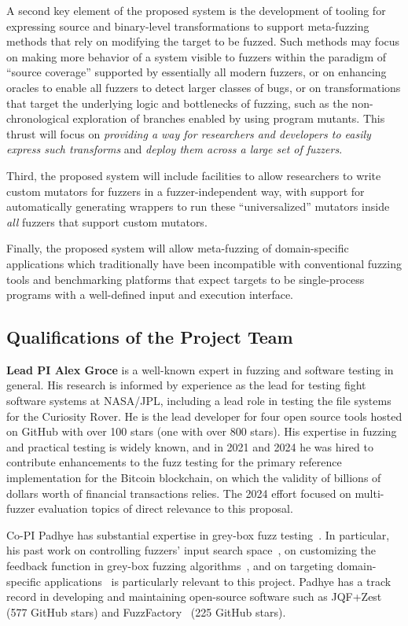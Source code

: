 A second key element of the proposed system is the development of tooling for 
expressing source and binary-level transformations to support meta-fuzzing 
methods that rely on modifying the target to be fuzzed.  Such methods may focus 
on making more behavior of a system visible to fuzzers within the paradigm of 
``source coverage'' supported by essentially all modern fuzzers, or 
on enhancing oracles to enable all fuzzers to detect larger classes of bugs, or 
on transformations that target the underlying logic and bottlenecks of fuzzing, 
such as the non-chronological exploration of branches enabled by using program 
mutants.  This thrust  will focus on \emph{providing a way for researchers and 
developers to easily express such transforms} and \emph{deploy them across a large set 
of fuzzers}.

Third, the proposed system will include facilities to allow researchers to 
write custom mutators for fuzzers in a fuzzer-independent way, with support for 
automatically generating wrappers to run these ``universalized'' mutators 
inside \emph{all} fuzzers that 
support custom mutators.

Finally, the proposed system will allow meta-fuzzing of domain-specific applications
which traditionally have been incompatible with conventional fuzzing tools and
benchmarking platforms that expect targets to be single-process programs with
a well-defined input and execution interface.

\subsection{Qualifications of the Project Team}

{\bf Lead PI Alex Groce} is a well-known expert in fuzzing and software testing
in general. His research is informed
by experience as the lead for testing fight software systems at NASA/JPL,
including a lead role in testing the file systems for the Curiosity
Rover. He is the lead developer for four open
source tools hosted on GitHub with over 100 stars (one with over 800
stars). His expertise in fuzzing and
practical testing is widely known, and in 2021 and 2024 he was hired to contribute enhancements to the fuzz testing for the primary reference
implementation for the Bitcoin blockchain, on which the validity of billions of dollars worth of
financial transactions relies.  The 2024 effort focused on multi-fuzzer
evaluation topics of direct relevance to this proposal.

Co-PI Padhye has substantial expertise in grey-box fuzz testing~\cite{perffuzz,
jqf, zest, fuzzfactory, rlcheck, bigfuzz, bonsai, naturalfuzz, mu2}. In
particular, his past work on controlling fuzzers' input search space~\cite{jqf,
zest}, on customizing the feedback function in grey-box fuzzing
algorithms~\cite{perffuzz, fuzzfactory, bonsai, mu2}, and on targeting
domain-specific applications~\cite{partemu, bigfuzz, naturalfuzz} is
particularly relevant to this project. Padhye has a track record in developing
and maintaining open-source software such as JQF+Zest~\cite{jqf-github} (577
GitHub stars) and FuzzFactory~\cite{fuzzfactory} (225 GitHub stars).

